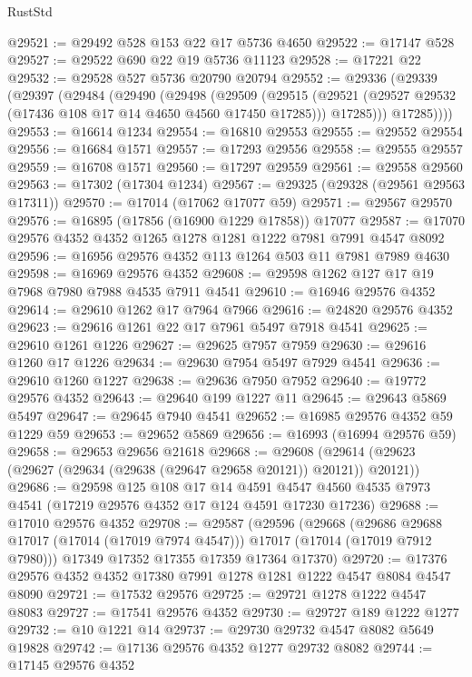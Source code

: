 \begin{lexlean}{RustStd}
\begin{coremodule}
@29521 := @29492 @528 @153 @22 @17 @5736 @4650
@29522 := @17147 @528
@29527 := @29522 @690 @22 @19 @5736 @11123
@29528 := @17221 @22
@29532 := @29528 @527 @5736 @20790 @20794
@29552 := @29336
    (@29339
      (@29397
        (@29484
          (@29490
            (@29498
              (@29509
                (@29515
                  (@29521 (@29527 @29532 (@17436 @108 @17 @14 @4650 @4560 @17450 @17285)))
                  @17285)))
            @17285))))
@29553 := @16614 @1234
@29554 := @16810 @29553
@29555 := @29552 @29554
@29556 := @16684 @1571
@29557 := @17293 @29556
@29558 := @29555 @29557
@29559 := @16708 @1571
@29560 := @17297 @29559
@29561 := @29558 @29560
@29563 := @17302 (@17304 @1234)
@29567 := @29325 (@29328 (@29561 @29563 @17311))
@29570 := @17014 (@17062 @17077 @59)
@29571 := @29567 @29570
@29576 := @16895 (@17856 (@16900 @1229 @17858)) @17077
@29587 := @17070 @29576 @4352 @4352 @1265 @1278 @1281 @1222 @7981 @7991 @4547 @8092
@29596 := @16956 @29576 @4352 @113 @1264 @503 @11 @7981 @7989 @4630
@29598 := @16969 @29576 @4352
@29608 := @29598 @1262 @127 @17 @19 @7968 @7980 @7988 @4535 @7911 @4541
@29610 := @16946 @29576 @4352
@29614 := @29610 @1262 @17 @7964 @7966
@29616 := @24820 @29576 @4352
@29623 := @29616 @1261 @22 @17 @7961 @5497 @7918 @4541
@29625 := @29610 @1261 @1226
@29627 := @29625 @7957 @7959
@29630 := @29616 @1260 @17 @1226
@29634 := @29630 @7954 @5497 @7929 @4541
@29636 := @29610 @1260 @1227
@29638 := @29636 @7950 @7952
@29640 := @19772 @29576 @4352
@29643 := @29640 @199 @1227 @11
@29645 := @29643 @5869 @5497
@29647 := @29645 @7940 @4541
@29652 := @16985 @29576 @4352 @59 @1229 @59
@29653 := @29652 @5869
@29656 := @16993 (@16994 @29576 @59)
@29658 := @29653 @29656 @21618
@29668 := @29608 (@29614 (@29623 (@29627 (@29634 (@29638 (@29647 @29658 @20121)) @20121)) @20121))
@29686 := @29598
    @125
    @108
    @17
    @14
    @4591
    @4547
    @4560
    @4535
    @7973
    @4541
    (@17219 @29576 @4352 @17 @124 @4591 @17230 @17236)
@29688 := @17010 @29576 @4352
@29708 := @29587
    (@29596
      (@29668
        (@29686 @29688 @17017 (@17014 (@17019 @7974 @4547)))
        @17017
        (@17014 (@17019 @7912 @7980)))
      @17349
      @17352
      @17355
      @17359
      @17364
      @17370)
@29720 := @17376 @29576 @4352 @4352 @17380 @7991 @1278 @1281 @1222 @4547 @8084 @4547 @8090
@29721 := @17532 @29576
@29725 := @29721 @1278 @1222 @4547 @8083
@29727 := @17541 @29576 @4352
@29730 := @29727 @189 @1222 @1277
@29732 := @10 @1221 @14
@29737 := @29730 @29732 @4547 @8082 @5649 @19828
@29742 := @17136 @29576 @4352 @1277 @29732 @8082
@29744 := @17145 @29576 @4352

\end{coremodule}
\end{lexlean}
